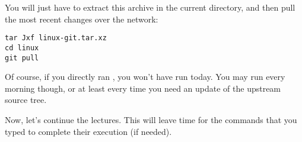 You will just have to extract this archive in the current directory,
and then pull the most recent changes over the network:

\begin{verbatim}
tar Jxf linux-git.tar.xz
cd linux
git pull
\end{verbatim}

Of course, if you directly ran , you won't have run 
 today. You may run  every morning though,
or at least every time you need an update of the upstream source tree.

Now, let's continue the lectures. This will leave time for the commands
that you typed to complete their execution (if needed).

